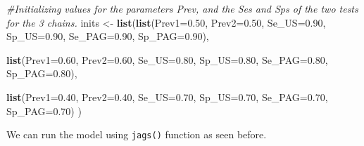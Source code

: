 \documentclass[
]{book}
\newenvironment{Shaded}{\begin{snugshade}}{\end{snugshade}}
\newcommand{\AttributeTok}[1]{\textcolor[rgb]{0.13,0.29,0.53}{#1}}
\newcommand{\CommentTok}[1]{\textcolor[rgb]{0.56,0.35,0.01}{\textit{#1}}}
\newcommand{\FloatTok}[1]{\textcolor[rgb]{0.00,0.00,0.81}{#1}}
\newcommand{\FunctionTok}[1]{\textcolor[rgb]{0.13,0.29,0.53}{\textbf{#1}}}
\newcommand{\NormalTok}[1]{#1}
\newcommand{\OtherTok}[1]{\textcolor[rgb]{0.56,0.35,0.01}{#1}}
\begin{document}
\begin{Shaded}
\begin{Highlighting}[]
\CommentTok{\#Initializing values for the parameters Prev, and the Ses and Sps of the two tests for the 3 chains.}
\NormalTok{inits }\OtherTok{\textless{}{-}} \FunctionTok{list}\NormalTok{(}\FunctionTok{list}\NormalTok{(}\AttributeTok{Prev1=}\FloatTok{0.50}\NormalTok{,}
              \AttributeTok{Prev2=}\FloatTok{0.50}\NormalTok{,}
              \AttributeTok{Se\_US=}\FloatTok{0.90}\NormalTok{,}
              \AttributeTok{Sp\_US=}\FloatTok{0.90}\NormalTok{,}
              \AttributeTok{Se\_PAG=}\FloatTok{0.90}\NormalTok{,}
              \AttributeTok{Sp\_PAG=}\FloatTok{0.90}\NormalTok{),}
              
              \FunctionTok{list}\NormalTok{(}\AttributeTok{Prev1=}\FloatTok{0.60}\NormalTok{,}
              \AttributeTok{Prev2=}\FloatTok{0.60}\NormalTok{,}
              \AttributeTok{Se\_US=}\FloatTok{0.80}\NormalTok{,}
              \AttributeTok{Sp\_US=}\FloatTok{0.80}\NormalTok{,}
              \AttributeTok{Se\_PAG=}\FloatTok{0.80}\NormalTok{,}
              \AttributeTok{Sp\_PAG=}\FloatTok{0.80}\NormalTok{),}
              
              \FunctionTok{list}\NormalTok{(}\AttributeTok{Prev1=}\FloatTok{0.40}\NormalTok{,}
              \AttributeTok{Prev2=}\FloatTok{0.40}\NormalTok{,}
              \AttributeTok{Se\_US=}\FloatTok{0.70}\NormalTok{,}
              \AttributeTok{Sp\_US=}\FloatTok{0.70}\NormalTok{,}
              \AttributeTok{Se\_PAG=}\FloatTok{0.70}\NormalTok{,}
              \AttributeTok{Sp\_PAG=}\FloatTok{0.70}\NormalTok{)}
\NormalTok{              )}
\end{Highlighting}
\end{Shaded}

We can run the model using \texttt{jags()} function as seen before.
\end{document}
